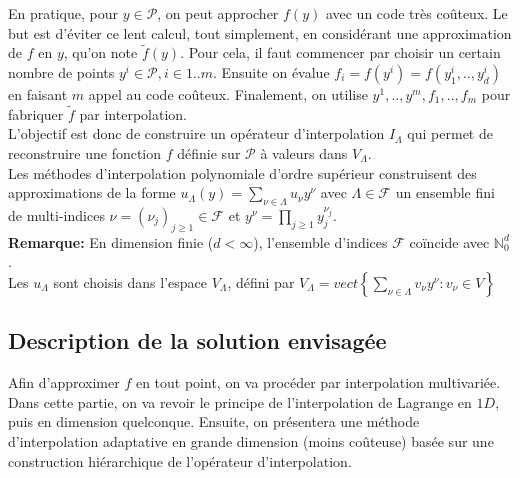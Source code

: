 En pratique, pour $y \in \mathcal{P}$, on peut approcher $f(y)$ avec un code très coûteux. Le but est d'éviter ce lent calcul, tout simplement, en considérant une approximation de $f$ en $y$, qu'on note $\tilde{f}(y)$. Pour cela, il faut commencer par choisir un certain nombre de points $y^i \in \mathcal{P}, i \in 1..m$. Ensuite on évalue $f_i = f(y^i) = f(y_1^i, .. , y_d^i)$ en faisant $m$ appel au code coûteux. Finalement, on utilise $y^1,..,y^m,f_1,..,f_m$ pour fabriquer $\tilde{f}$ par interpolation.\\

L'objectif est donc de construire un opérateur d'interpolation $I_{\Lambda}$ qui permet de reconstruire une fonction $f$ définie sur $\mathcal{P}$ à valeurs dans $V_{\Lambda}$. \\
Les méthodes d'interpolation polynomiale d'ordre supérieur construisent des approximations de la forme $u_{\Lambda}(y) = \sum_{\nu \in \Lambda} u_{\nu} y^{\nu}$ avec $\Lambda \in \mathcal{F}$ un ensemble fini de multi-indices $\nu = (\nu_j)_{j \geq 1} \in \mathcal{F}$ et $y^{\nu} = \prod_{j \geq 1} y_j ^ {\nu_j}$. \\

\textbf{Remarque:}
En dimension finie ($d < \infty$), l'ensemble d'indices $\mathcal{F}$ coïncide avec $\mathbb{N}_0^d$.\\
Les $u_{\Lambda}$ sont choisis dans l'espace $V_{\Lambda}$, défini par $V_{\Lambda} = vect \left \{ \sum_{\nu \in \Lambda} v_{\nu} y^{\nu} : v_{\nu} \in V \right \}$


\subsection{Description de la solution envisagée}\label{sec:4.1}
\hspace{0.5cm}
Afin d'approximer $f$ en tout point, on va procéder par interpolation multivariée. Dans cette partie, on va revoir le principe de l'interpolation de Lagrange en $1D$, puis en dimension quelconque. Ensuite, on présentera une méthode d'interpolation adaptative en grande dimension (moins coûteuse) basée sur une construction hiérarchique de l'opérateur d'interpolation. \\

